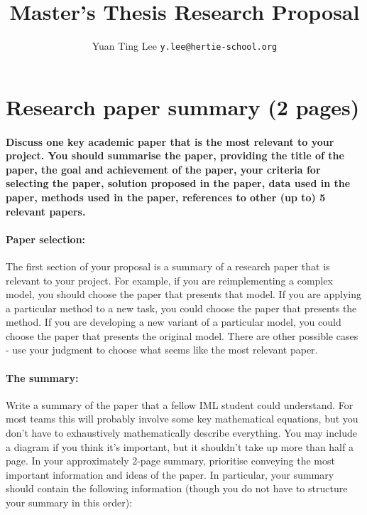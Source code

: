 \documentclass[10pt,twocolumn,letterpaper]{article}
\begin{document}
\title{Master's Thesis Research Proposal}

\author{Yuan Ting Lee  
{\tt\small y.lee@hertie-school.org}
}

\maketitle






\section{Research paper summary (2 pages)}

\paragraph{Discuss one key academic paper that is the most relevant to your project. You should summarise the paper, providing the title of the paper, the goal and achievement of the paper, your criteria for selecting the paper, solution proposed in the paper, data used in the paper, methods used in the paper, references to other (up to) 5 relevant papers.}

\paragraph{Paper selection:} The first section of your proposal is a summary of a research paper that is relevant to your project. For example, if you are reimplementing a complex model, you should choose the paper that presents that model. If you are applying a particular method to a new task, you could choose the paper that presents the method. If you are developing a new variant of a particular model, you could choose the paper that presents the original model. There are other possible cases - use your judgment to choose what seems like the most relevant paper. 

\paragraph{The summary:} Write a summary of the paper that a fellow IML student could understand. For most teams this will probably involve some key mathematical equations, but you don't have to exhaustively mathematically describe everything. You may include a diagram if you think it's important, but it shouldn't take up more than half a page. In your approximately 2-page summary, prioritise conveying the most important information and ideas of the paper. In particular, your summary should contain the following information (though you do not have to structure your summary in this order):
\end{document}
